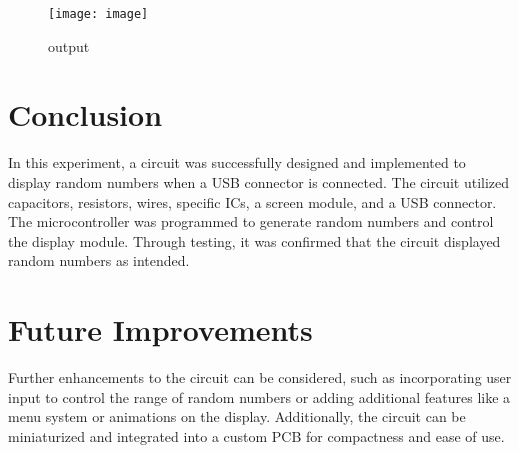 \documentclass{article}
\begin{document}
\begin{figure}[htbp]
  \centering
  \texttt{[image: image]}
  \caption{output}
  \label{fig:image_label}
\end{figure}

\section{Conclusion}
In this experiment, a circuit was successfully designed and implemented to display random numbers when a USB connector is connected. The circuit utilized capacitors, resistors, wires, specific ICs, a screen module, and a USB connector. The microcontroller was programmed to generate random numbers and control the display module. Through testing, it was confirmed that the circuit displayed random numbers as intended.

\section{Future Improvements}
Further enhancements to the circuit can be considered, such as incorporating user input to control the range of random numbers or adding additional features like a menu system or animations on the display. Additionally, the circuit can be miniaturized and integrated into a custom PCB for compactness and ease of use.
\end{document}
